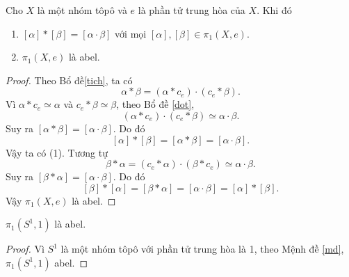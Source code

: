 \begin{proposition}\label{md}
    Cho $X$ là một nhóm tôpô và $e$ là phần tử trung hòa của $X$. Khi đó
    \begin{enumerate}
    	\item[(1)]  $[\alpha]*[\beta]=[\alpha \cdot \beta]$ với mọi $[\alpha],[\beta]\in \pi_1(X,e)$.
    	\item[(2)] $\pi_1(X,e)$ là abel.
    \end{enumerate}
\end{proposition}
\begin{proof}
    Theo Bổ đề\ref{tich}, ta có
    \[\alpha*\beta = (\alpha*c_e)\cdot (c_e*\beta).\]
    Vì $\alpha*c_e\simeq \alpha $ và $c_e*\beta \simeq\beta$, theo Bổ đề \ref{dot},
    \[
     (\alpha*c_e)\cdot (c_e*\beta)\simeq \alpha\cdot \beta.
     \]
     Suy ra $[\alpha *\beta]= [\alpha\cdot \beta]$. Do đó
     \[
     [\alpha]*[\beta] = [\alpha *\beta]= [\alpha\cdot \beta].
     \]
     Vậy ta có (1). 
     Tương tự
     \[\beta*\alpha = (c_e*\alpha)\cdot (\beta*c_e)\simeq \alpha \cdot \beta.\]
     Suy ra $[\beta*\alpha]=[\alpha \cdot \beta]$. 
     Do đó
     \[
     [\beta]*[\alpha]=[\beta* \alpha]= [\alpha \cdot \beta]= [\alpha]*[\beta].
     \]
    Vậy $\pi_1(X,e)$ là abel.
\end{proof}
\begin{corollary}
    $\pi_1(S^1,1)$ %
    là abel.
\end{corollary}
\begin{proof}
	Vì $S^1$ là một nhóm tôpô với phần tử trung hòa là 1, theo Mệnh đề \ref{md}, $\pi_1(S^1,1)$ abel.
	\end{proof}
	

